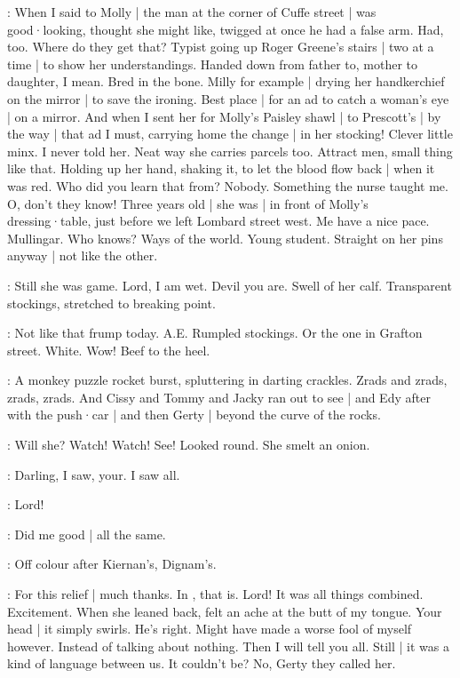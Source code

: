 \BloomHist:
When I said to Molly |
the man at the corner of Cuffe street |
was good·looking,
thought she might like,
twigged at once
he had a false arm.
Had,
too.
Where do they get that?
Typist going up Roger Greene's stairs |
two at a time |
to show her understandings.
Handed down from father to,
mother to daughter,
I mean.
Bred in the bone.
Milly for example |
drying her handkerchief
on the mirror |
to save the ironing.
Best place |
for an ad to catch a woman's eye |
on a mirror.%
And when I sent her
for Molly's Paisley shawl |
to Prescott's |
by the way |
that ad I must,
carrying home the change |
in her stocking!
Clever little minx.
I never told her.
Neat way she carries parcels too.
Attract men,
small thing like that.
Holding up her hand,
shaking it,
to let the blood flow back |
when it was red.
Who did you learn that from?
Nobody.
Something the nurse taught me.
O,
don't they know!
Three years old |
she was |
in front of Molly's dressing·table,
just before we left Lombard street west.
Me have a nice pace.
Mullingar.
Who knows?
Ways of the world.
Young student.
Straight on her pins anyway |
not like the other.

\BloomCurrent:
Still she was game.
Lord,
I am wet.
Devil you are.
Swell of her calf.
Transparent stockings,
stretched to breaking point.%

\BloomCurrent:
Not like that frump today.
A.E.
Rumpled stockings.
Or the one in Grafton street.
White.
Wow!
Beef to the heel.

:
A monkey puzzle rocket burst,
spluttering in darting crackles.
Zrads and zrads,
zrads,
zrads.
And Cissy and Tommy and Jacky ran out to see |
and Edy after with the push·car |
and then Gerty |
beyond the curve of the rocks.

\BloomInt:
Will she?
Watch!
Watch!
See!
Looked round.
She smelt an onion.

\BloomAbstract:
Darling,
I saw,
your.
I saw all.

\BloomInt:
Lord!

\BloomCurrent:
Did me good |
all the same.

\BloomToday:
Off colour after Kiernan's,
Dignam's.

\BloomCurrent:
For this relief |
much thanks.
In ,
that is.%
Lord!
It was all things combined.
Excitement.
When she leaned back,
felt an ache at the butt of my tongue.
Your head |
it simply swirls.
He's right.
Might have made a worse fool of myself however.
Instead of talking about nothing.
Then I will tell you all.
Still |
it was a kind of language between us.
It couldn't be?
No,
Gerty they called her.


